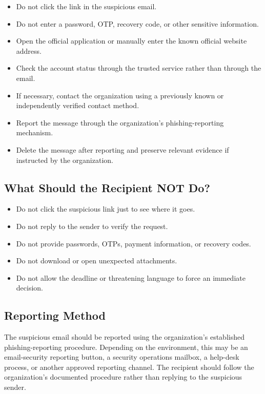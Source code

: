 \documentclass[11pt,a4paper]{article}
\begin{document}
\begin{itemize}
    \item Do not click the link in the suspicious email.
    \item Do not enter a password, OTP, recovery code, or other sensitive information.
    \item Open the official application or manually enter the known official website address.
    \item Check the account status through the trusted service rather than through the email.
    \item If necessary, contact the organization using a previously known or independently verified contact method.
    \item Report the message through the organization's phishing-reporting mechanism.
    \item Delete the message after reporting and preserve relevant evidence if instructed by the organization.
\end{itemize}

\subsection{What Should the Recipient NOT Do?}

\begin{itemize}
    \item Do not click the suspicious link just to see where it goes.
    \item Do not reply to the sender to verify the request.
    \item Do not provide passwords, OTPs, payment information, or recovery codes.
    \item Do not download or open unexpected attachments.
    \item Do not allow the deadline or threatening language to force an immediate decision.
\end{itemize}

\subsection{Reporting Method}

The suspicious email should be reported using the organization's established phishing-reporting procedure. Depending on the environment, this may be an email-security reporting button, a security operations mailbox, a help-desk process, or another approved reporting channel. The recipient should follow the organization's documented procedure rather than replying to the suspicious sender.
\end{document}
